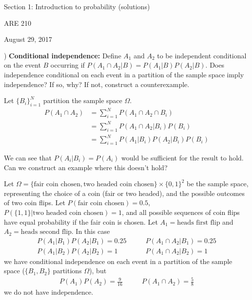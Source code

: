 \documentclass[12pt,english]{article}
\begin{document}
\begin{center}
{\Large{}Section 1: Introduction to probability (solutions)}
\par\end{center}{\Large \par}

\begin{center}
ARE 210
\par\end{center}

\begin{center}
August 29, 2017
\par\end{center}

) \textbf{Conditional independence:} Define $A_{1}$ and $A_{2}$ to be independent conditional on the event $B$ occurring if $P(A_{1} \cap A_{2} | B) = P(A_{1} | B) P(A_{2} | B)$. Does independence conditional on each event in a partition of the sample space imply independence? If so, why? If not, construct a counterexample.

\vspace{1em}

Let $\{ B_{i} \}_{i=1}^{N}$ partition the sample space $\Omega$.
\begin{align*}
P(A_{1} \cap A_{2}) & = \sum_{i = 1}^{N} P(A_{1} \cap A_{2} \cap B_{i}) \\
& = \sum_{i = 1}^{N} P(A_{1} \cap A_{2} | B_{i}) P(B_{i}) \\
& = \sum_{i = 1}^{N} P(A_{1} | B_{i}) P(A_{2} | B_{i}) P(B_{i})
\end{align*}

We can see that $P(A_{i} | B_{i}) = P(A_{i})$ would be sufficient for the result to hold. Can we construct an example where this doesn't hold?

Let $\Omega = \{\text{fair coin chosen}, \text{two headed coin chosen} \} \times \{0, 1\}^{2}$ be the sample space, representing the choice of a coin (fair or two headed), and the possible outcomes of two coin flips. Let $P(\text{fair coin chosen}) = 0.5$, $P(\{1, 1\} | \text{two headed coin chosen}) = 1$, and all possible sequences of coin flips have equal probability if the fair coin is chosen. Let $A_{1} = \text{heads first flip}$ and $A_{2} = \text{heads second flip}$. In this case
\begin{align*}
P(A_{1} | B_{1}) P (A_{2} | B_{1}) = 0.25 & \qquad P(A_{1} \cap A_{2} | B_{1}) = 0.25 \\
P(A_{1} | B_{2}) P (A_{2} | B_{2}) = 1 & \qquad P(A_{1} \cap A_{2} | B_{2}) = 1
\end{align*}
we have conditional independence on each event in a partition of the sample space ($\{ B_{1}, B_{2} \}$ partitions $\Omega$), but
\begin{align*}
P(A_{1}) P(A_{2}) = \frac{9}{16} & \qquad P(A_{1} \cap A_{2}) = \frac{5}{8}
\end{align*}
we do not have independence.
\end{document}
